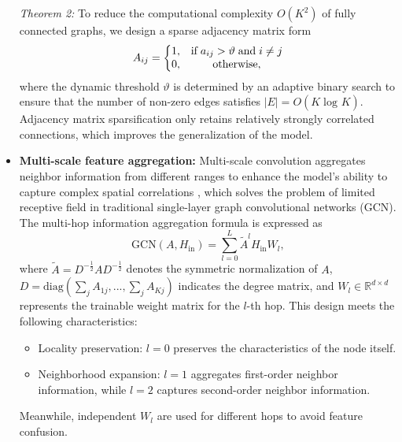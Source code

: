 \documentclass[lettersize,journal]{IEEEtran}
\begin{document}
\begin{CJK}{UTF8}{gbsn}
\begin{itemize}
{\emph{Theorem 2:}} To reduce the computational complexity $O(K^2)$ of fully connected graphs, we design a sparse adjacency matrix form
\begin{equation}\label{eq-40}A_{ij}=\left\{\begin{matrix}
  1,& \text{if} \hspace{0.1cm} a_{ij}> \vartheta \hspace{0.1cm} \text{and}\hspace{0.1cm} i\ne j\\ 
  0,& \text{otherwise},
\end{matrix}\right.\end{equation}
where the dynamic threshold $\vartheta$ is determined by an adaptive binary search to ensure that the number of non-zero edges satisfies $\left | E \right | =O\left ( K\log_{}{K}  \right ) $. Adjacency matrix sparsification only retains relatively strongly correlated connections, which improves the generalization of the model.

\item{\bf{Multi-scale feature aggregation:}}
Multi-scale convolution aggregates neighbor information from different ranges to enhance the model's ability to capture complex spatial correlations \cite{paper14}, which solves the problem of limited receptive field in traditional single-layer graph convolutional networks (GCN). The multi-hop information aggregation formula is expressed as
\begin{equation}\label{eq-41}\text{GCN}\left ( A,H_{\text{in}} \right ) =\sum_{l=0}^{L} \tilde{A} ^lH_{\text{in}}W_l,\end{equation}
where $\tilde{A} =D^{-\frac{1}{2} }AD^{-\frac{1}{2} }$ denotes the symmetric normalization of $A$, $D=\text{diag}\left (  {\textstyle \sum_{j}^{}A_{1j},..., {\textstyle \sum_{j}^{}A_{Kj}} }  \right ) $ indicates the degree matrix, and $W_l\in \mathbb{R}^{d\times d} $ represents the trainable weight matrix for the $l$-th hop. This design meets the following characteristics:
\begin{itemize}
    \item Locality preservation: $l=0$ preserves the characteristics of the node itself.
    \item Neighborhood expansion: $l=1$ aggregates first-order neighbor information, while $l=2$ captures second-order neighbor information.
\end{itemize}
Meanwhile, independent $W_l$ are used for different hops to avoid feature confusion.


\end{itemize}
\end{CJK}
\end{document}
